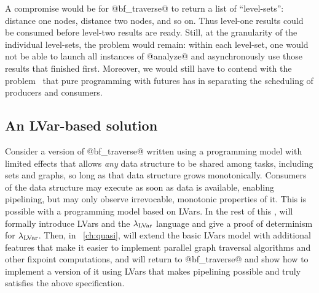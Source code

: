 A compromise would be for @bf_traverse@ to return a list of
``level-sets'': distance one nodes, distance two nodes, and so on.
Thus level-one results could be consumed before level-two results are
ready.  Still, at the granularity of the individual level-sets, the
problem would remain: within each level-set, one would not be able to
launch all instances of @analyze@ and asynchronously use those results
that finished first.  Moreover, we would still have to contend with
the problem~\cite{monad-par} that pure programming with futures 
has in separating the scheduling of producers and consumers.


\subsection{An LVar-based solution}

Consider a version of @bf_traverse@ written using a programming model
with limited effects that allows \emph{any} data structure to be
shared among tasks, including sets and graphs, so long as that data
structure grows monotonically.  Consumers of the data structure may
execute as soon as data is available, enabling pipelining, but may
only observe irrevocable, monotonic properties of it. This is possible
with a programming model based on LVars.  In the rest of this ,
 will formally introduce LVars and the $\lambda_{\textrm{LVar}}$ language and
give a proof of determinism for $\lambda_{\textrm{LVar}}$.  Then, in
~\ref{ch:quasi},  will extend the basic LVars model with
additional features that make it easier to implement parallel graph
traversal algorithms and other fixpoint computations, and  will
return to @bf_traverse@ and show how to implement a version of it
using LVars that makes pipelining possible and truly satisfies the
above specification.
